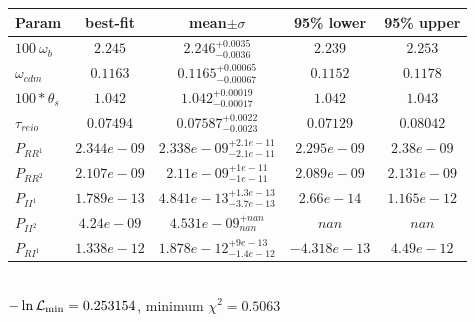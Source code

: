 \begin{tabular}{|l|c|c|c|c|} 
 \hline 
Param & best-fit & mean$\pm\sigma$ & 95\% lower & 95\% upper \\ \hline 
$100~\omega_{b }$ &$2.245$ & $2.246_{-0.0036}^{+0.0035}$ & $2.239$ & $2.253$ \\ 
$\omega_{cdm }$ &$0.1163$ & $0.1165_{-0.00067}^{+0.00065}$ & $0.1152$ & $0.1178$ \\ 
$100*\theta_{s }$ &$1.042$ & $1.042_{-0.00017}^{+0.00019}$ & $1.042$ & $1.043$ \\ 
$\tau_{reio }$ &$0.07494$ & $0.07587_{-0.0023}^{+0.0022}$ & $0.07129$ & $0.08042$ \\ 
$P_{{RR}^1 }$ &$2.344e-09$ & $2.338e-09_{-2.1e-11}^{+2.1e-11}$ & $2.295e-09$ & $2.38e-09$ \\ 
$P_{{RR}^2 }$ &$2.107e-09$ & $2.11e-09_{-1e-11}^{+1e-11}$ & $2.089e-09$ & $2.131e-09$ \\ 
$P_{{II}^1 }$ &$1.789e-13$ & $4.841e-13_{-3.7e-13}^{+1.3e-13}$ & $2.66e-14$ & $1.165e-12$ \\ 
$P_{{II}^2 }$ &$4.24e-09$ & $4.531e-09_{nan}^{+nan}$ & $nan$ & $nan$ \\ 
$P_{{RI}^1 }$ &$1.338e-12$ & $1.878e-12_{-1.4e-12}^{+9e-13}$ & $-4.318e-13$ & $4.49e-12$ \\ 
\hline 
 \end{tabular} \\ 
$-\ln{\cal L}_\mathrm{min} =0.253154$, minimum $\chi^2=0.5063$ \\ 
